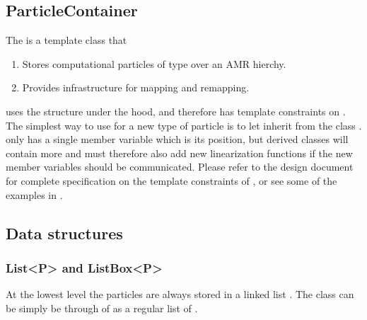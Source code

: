 \documentclass[letterpaper,10pt,english]{sphinxmanual}
\begin{document}
\subsection{ParticleContainer}
\label{\detokenize{Source/Particles:particlecontainer}}
The  is a template class that
\begin{enumerate}
%
\item {} 
Stores computational particles of type  over an AMR hierchy.

\item {} 
Provides infrastructure for mapping and remapping.

\end{enumerate}

 uses the  structure  under the hood, and therefore has template constraints on .
The simplest way to use  for a new type of particle is to let  inherit from the  class .
 only has a single member variable which is its position, but derived classes will contain more and must therefore also add new linearization functions if the new member variables should be communicated.
Please refer to the  design document for complete specification on the template constraints of , or see some of the examples in .


\subsection{Data structures}
\label{\detokenize{Source/Particles:data-structures}}

\subsubsection{List\textless{}P\textgreater{} and ListBox\textless{}P\textgreater{}}
\label{\detokenize{Source/Particles:list-p-and-listbox-p}}
At the lowest level the particles are always stored in a linked list .
The class can be simply be through of as a regular list of .
\end{document}
